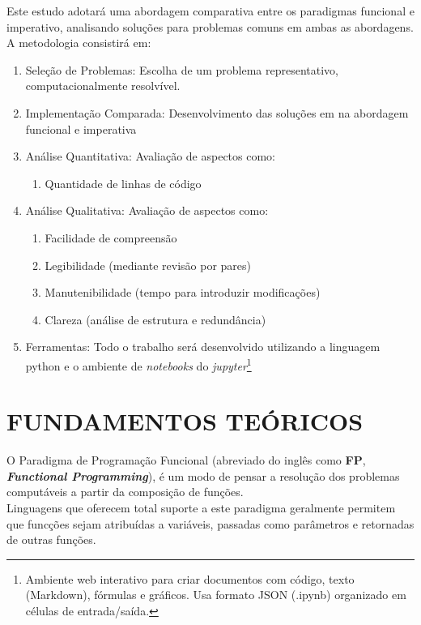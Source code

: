 \documentclass[date,twocolumn,a4paper]{ppgem}
\begin{document}
    Este estudo adotará uma abordagem comparativa entre os paradigmas funcional e imperativo, analisando soluções para problemas comuns em ambas as abordagens. A metodologia consistirá em:
    \begin{enumerate}
        \item Seleção de Problemas: Escolha de um problema representativo, computacionalmente resolvível.
        \item Implementação Comparada: Desenvolvimento das soluções em na abordagem funcional e imperativa
        \item Análise Quantitativa: Avaliação de aspectos como:
        \begin{enumerate}
            \item Quantidade de linhas de código
        \end{enumerate}
        \item Análise Qualitativa: Avaliação de aspectos como:
        \begin{enumerate}
            \item Facilidade de compreensão
            \item Legibilidade (mediante revisão por pares)
            \item Manutenibilidade (tempo para introduzir modificações)
            \item Clareza (análise de estrutura e redundância)
        \end{enumerate}
        \item Ferramentas: Todo o trabalho será desenvolvido utilizando a linguagem python
            e o ambiente de \textit{notebooks} do \textit{jupyter}\footnote{
                 Ambiente web interativo para criar documentos com código, texto (Markdown), fórmulas e gráficos. Usa formato JSON (.ipynb) organizado em células de entrada/saída\cite{wiki_jupyter_notebook}.
            }
    \end{enumerate}


    \section{FUNDAMENTOS TEÓRICOS}
        O Paradigma de Programação Funcional (abreviado do inglês como \textbf{FP}, \textit{\textbf{Functional Programming}}), é um modo de pensar
        a resolução dos problemas computáveis a partir da composição de funções\cite{queiroz_func_prog}.\\
        Linguagens que oferecem total suporte a este paradigma geralmente permitem que funcções sejam atribuídas a variáveis, passadas como parâmetros
        e retornadas de outras funções.
\end{document}
